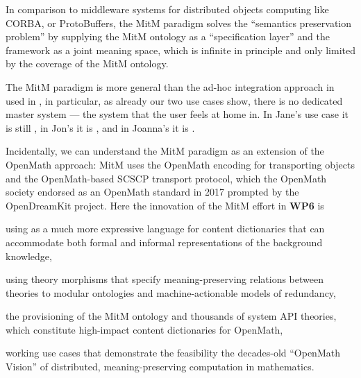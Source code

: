 In comparison to middleware systems for distributed objects computing like CORBA, or ProtoBuffers, the MitM paradigm solves the ``semantics preservation problem'' by supplying the MitM ontology as a ``specification layer'' and the \ommt framework as a joint meaning space, which is infinite in principle and only limited by the coverage of the MitM ontology. 

The MitM paradigm is more general than the ad-hoc integration approach in used in \Sage, in particular, as already our two use cases show, there is no dedicated master system --- the system that the user feels at home in.
In Jane's use case it is still \Sage, in Jon's it is \GAP, and in Joanna's it is \LMFDB.

Incidentally, we can understand the MitM paradigm as an extension of the OpenMath approach: MitM uses the OpenMath encoding for transporting objects and the OpenMath-based SCSCP transport protocol, which the OpenMath society endorsed as an OpenMath standard in 2017 prompted by the OpenDreamKit project.
Here the innovation of the MitM effort in \textbf{WP6} is
\begin{compactenum}
  \item using \ommt as a much more expressive language for content dictionaries that can accommodate both formal and informal representations of the background knowledge,
  \item using theory morphisms that specify meaning-preserving relations between theories to modular ontologies and machine-actionable models of redundancy,
  \item the provisioning of the MitM ontology and thousands of system API theories, which constitute high-impact content dictionaries for OpenMath,
  \item working use cases that demonstrate the feasibility the decades-old ``OpenMath Vision'' of distributed, meaning-preserving computation in mathematics.
\end{compactenum}

